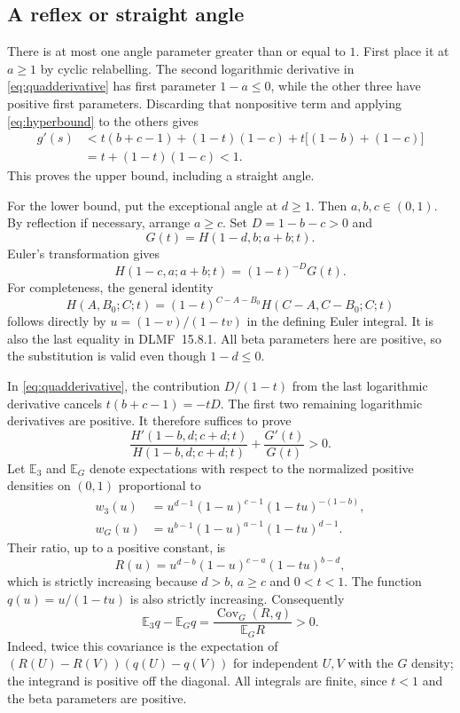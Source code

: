 \documentclass[11pt,a4paper]{article}
\theoremstyle{definition}
\theoremstyle{remark}
\numberwithin{equation}{section}
\begin{document}
\subsection{A reflex or straight angle}
There is at most one angle parameter greater than or equal to $1$. First place it at $a\ge1$ by cyclic relabelling. The second logarithmic derivative in \eqref{eq:quadderivative} has first parameter $1-a\le0$, while the other three have positive first parameters. Discarding that nonpositive term and applying \eqref{eq:hyperbound} to the others gives
\begin{align*}
g'(s)&<t(b+c-1)+(1-t)(1-c)
                 +t\bigl[(1-b)+(1-c)\bigr]\\
     &=t+(1-t)(1-c)<1.
\end{align*}
This proves the upper bound, including a straight angle.

For the lower bound, put the exceptional angle at $d\ge1$. Then $a,b,c\in(0,1)$. By reflection if necessary, arrange $a\ge c$. Set $D=1-b-c>0$ and
\[
G(t)=H(1-d,b;a+b;t).
\]
Euler's transformation gives
\begin{equation}\label{eq:quad-euler}
H(1-c,a;a+b;t)=(1-t)^{-D}G(t).
\end{equation}
For completeness, the general identity
\[
H(A,B_0;C;t)=(1-t)^{C-A-B_0}H(C-A,C-B_0;C;t)
\]
follows directly by $u=(1-v)/(1-tv)$ in the defining Euler integral. It is also the last equality in DLMF~15.8.1\cite{dlmf}. All beta parameters here are positive, so the substitution is valid even though $1-d\le0$.

In \eqref{eq:quadderivative}, the contribution $D/(1-t)$ from the last logarithmic derivative cancels $t(b+c-1)=-tD$. The first two remaining logarithmic derivatives are positive. It therefore suffices to prove
\begin{equation}\label{eq:quad-pair-positive}
\frac{H'(1-b,d;c+d;t)}{H(1-b,d;c+d;t)}+\frac{G'(t)}{G(t)}>0.
\end{equation}
Let $\mathbb E_3$ and $\mathbb E_G$ denote expectations with respect to the normalized positive densities on $(0,1)$ proportional to
\begin{align*}
w_3(u)&=u^{d-1}(1-u)^{c-1}(1-tu)^{-(1-b)},\\
w_G(u)&=u^{b-1}(1-u)^{a-1}(1-tu)^{d-1}.
\end{align*}
Their ratio, up to a positive constant, is
\[
R(u)=u^{d-b}(1-u)^{c-a}(1-tu)^{b-d},
\]
which is strictly increasing because $d>b$, $a\ge c$ and $0<t<1$. The function $q(u)=u/(1-tu)$ is also strictly increasing. Consequently
\[
\mathbb E_3 q-\mathbb E_G q
  =\frac{\operatorname{Cov}_G(R,q)}{\mathbb E_G R}>0.
\]
Indeed, twice this covariance is the expectation of
$(R(U)-R(V))(q(U)-q(V))$ for independent $U,V$ with the $G$ density; the integrand is positive off the diagonal. All integrals are finite, since $t<1$ and the beta parameters are positive.
\end{document}
